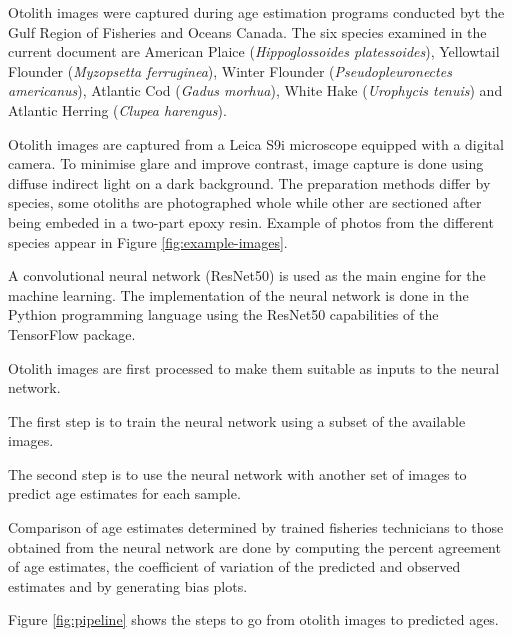 

Otolith images were captured during age estimation programs conducted byt the Gulf Region of Fisheries and Oceans Canada. The six species examined in the current document are American Plaice (\emph{Hippoglossoides platessoides}), Yellowtail Flounder (\emph{Myzopsetta ferruginea}), Winter Flounder (\emph{Pseudopleuronectes americanus}), Atlantic Cod (\emph{Gadus morhua}), White Hake (\emph{Urophycis tenuis}) and Atlantic Herring (\emph{Clupea harengus}).

Otolith images are captured from a Leica S9i microscope equipped with a digital camera. To minimise glare and improve contrast, image capture is done using diffuse indirect light on a dark background. The preparation methods differ by species, some otoliths are photographed whole while other are sectioned after being embeded in a two-part epoxy resin. Example of photos from the different species appear in Figure \ref{fig:example-images}.

A convolutional neural network (ResNet50) is used as the main engine for the machine learning. The implementation of the neural network is done in the Pythion programming language using the ResNet50 capabilities of the TensorFlow package.

Otolith images are first processed to make them suitable as inputs to the neural network.

The first step is to train the neural network using a subset of the available images.

The second step is to use the neural network with another set of images to predict age estimates for each sample.

Comparison of age estimates determined by trained fisheries technicians to those obtained from the neural network are done by computing the percent agreement of age estimates, the coefficient of variation of the predicted and observed estimates and by generating bias plots.

Figure \ref{fig:pipeline} shows the steps to go from otolith images to predicted ages.

